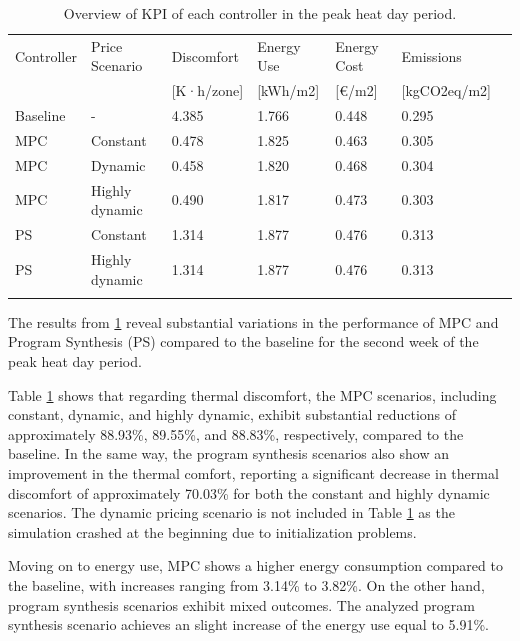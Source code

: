 \begin{table}[H]
    \caption{Overview of KPI of each controller in the peak heat day period.}
    \label{tab:2}
    
    \centering
    \begin{tabular}{lllllll}
        \hline
        \noalign{\smallskip}
        Controller & Price Scenario & Discomfort & Energy Use & Energy Cost & Emissions  \\
        & & [K·h/zone] & [kWh/m2] & [€/m2] & [kgCO2eq/m2] \\
        \noalign{\smallskip}
        \hline
        \noalign{\smallskip}
        Baseline & - & 4.385 & 1.766 & 0.448 & 0.295 \\
        MPC & Constant & 0.478 & 1.825 & 0.463 & 0.305 \\
        MPC & Dynamic & 0.458 & 1.820 & 0.468 & 0.304 \\
        MPC & Highly dynamic & 0.490 & 1.817 & 0.473 & 0.303 \\
        PS & Constant & 1.314 & 1.877 & 0.476 & 0.313 \\
        PS & Highly dynamic & 1.314 & 1.877 & 0.476 & 0.313 \\
        \noalign{\smallskip}
        \hline
    \end{tabular}
\end{table}

 The results from \ref{tab:2} reveal substantial variations in the performance of MPC and Program Synthesis (PS) compared to the baseline for the second week of the peak heat day period.

Table \ref{tab:2} shows that regarding thermal discomfort, the MPC scenarios, including constant, dynamic, and highly dynamic, exhibit substantial reductions of approximately 88.93\%, 89.55\%, and 88.83\%, respectively, compared to the baseline. In the same way, the program synthesis scenarios also show an improvement in the thermal comfort, reporting a significant decrease in thermal discomfort of approximately 70.03\% for both the constant and highly dynamic scenarios. The dynamic pricing scenario is not included in Table \ref{tab:2} as the simulation crashed at the beginning due to initialization problems.

Moving on to energy use, MPC shows a higher energy consumption compared to the baseline, with increases ranging from 3.14\% to 3.82\%. On the other hand, program synthesis scenarios exhibit mixed outcomes. The analyzed program synthesis scenario achieves an slight increase of the energy use equal to 5.91\%.

